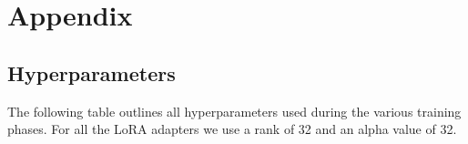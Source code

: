 \documentclass[11pt]{article}
\begin{document}


\FloatBarrier


\balance


% 

\clearpage
{}
\onecolumn

\appendix
\section{Appendix}
\setcounter{table}{0}
\renewcommand{\thetable}{A\arabic{table}}

\subsection{Hyperparameters}
The following table outlines all hyperparameters used during the various training phases.
For all the LoRA adapters we use a rank of 32 and an alpha value of 32. 
\end{document}
